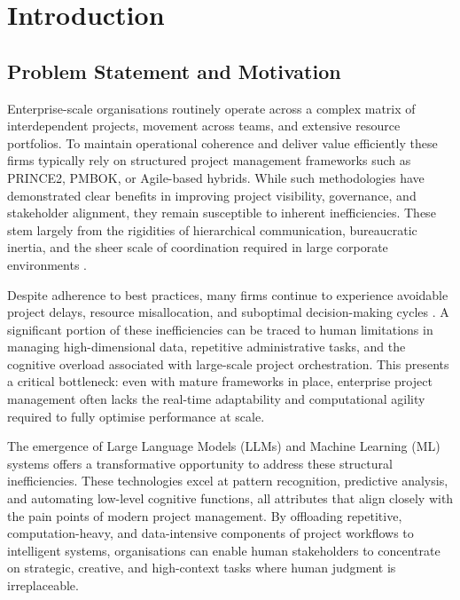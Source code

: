 \documentclass{report}
\begin{document}
\tableofcontents

\newpage

\chapter{Introduction}  %
\section{Problem Statement and Motivation}

Enterprise-scale organisations routinely operate across a complex matrix of interdependent projects, movement across teams, and extensive resource portfolios.
To maintain operational coherence and deliver value efficiently these firms typically rely on structured project management frameworks such as PRINCE2, PMBOK, or Agile-based hybrids. 
While such methodologies have demonstrated clear benefits in improving project visibility, governance, and stakeholder alignment, they remain susceptible to inherent inefficiencies. 
These stem largely from the rigidities of hierarchical communication, bureaucratic inertia, and the sheer scale of coordination required in large corporate environments \parencite{pricaEnhancingProjectEfficiency2025}.

Despite adherence to best practices, many firms continue to experience avoidable project delays, resource misallocation, and suboptimal decision-making cycles \parencite{mankinsTurningGreatStrategy2005}. 
A significant portion of these inefficiencies can be traced to human limitations in managing high-dimensional data, repetitive administrative tasks, and the cognitive overload associated with large-scale project orchestration. 
This presents a critical bottleneck: even with mature frameworks in place, enterprise project management often lacks the real-time adaptability and computational agility required to fully optimise performance at scale.

The emergence of Large Language Models (LLMs) and Machine Learning (ML) systems offers a transformative opportunity to address these structural inefficiencies. 
These technologies excel at pattern recognition, predictive analysis, and automating low-level cognitive functions, all attributes that align closely with the pain points of modern project management. 
By offloading repetitive, computation-heavy, and data-intensive components of project workflows to intelligent systems, organisations can enable human stakeholders to concentrate on strategic, creative, and high-context tasks where human judgment is irreplaceable.
\end{document}
